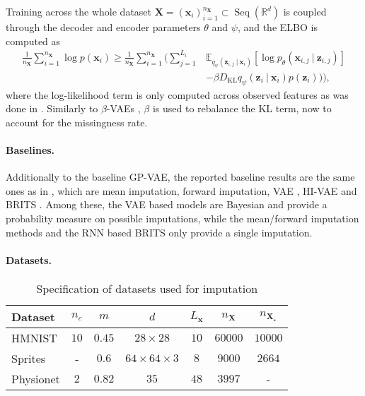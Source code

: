 \documentclass{article} \usepackage{iclr2021_conference,times}
\newcommand{\R}{\mathbb{R}}
\newcommand{\KL}{D_{\mathrm{KL}}}
\newcommand{\bx}{\mathbf{x}}
\newcommand{\bX}{\mathbf{X}}
\newcommand{\bz}{\mathbf{z}}
\newcommand{\EE}{\mathbb{E}}
\renewcommand\given[1][]{\:#1\vert\:}
\newcommand{\Seq}[1]{\operatorname{Seq}(#1)}
\theoremstyle{plain}
\theoremstyle{definition}
\begin{document}
Training across the whole dataset $\bX = (\bx_i)_{i=1}^{n_\bX} \subset \Seq{\R^d}$ is coupled through the decoder and encoder parameters $\theta$ and $\psi$, and the ELBO is computed as
\begin{align}
    \frac{1}{n_\bX} \sum_{i=1}^{n_\bX} \log p(\bx_i) \geq \frac{1}{n_\bX}\sum_{i=1}^{n_\bX} \Big( \sum_{j=1}^{L_i} &\EE_{q_\psi(\bz_{i, j} \given \bx_i)}[\log p_\theta(\bx_{i, j} \given \bz_{i, j})] \\
    &- \beta \KL{q_\psi(\bz_i \given \bx_i)}{p(\bz_{i})}) \Big), 
\end{align}
where the log-likelihood term is only computed across observed features as was done in \citet{nazabal2018handling}. Similarly to $\beta$-VAEs \citep{higgins2017beta}, $\beta$ is used to rebalance the KL term, now to account for the missingness rate. 

\paragraph{Baselines.} Additionally to the baseline GP-VAE, the reported baseline results are the same ones as in \citet{fortuin2019gpvae}, which are mean imputation, forward imputation, VAE \citep{kingma2013auto}, HI-VAE \citep{nazabal2018handling} and BRITS \citep{Cao2018brits}. Among these, the VAE based models are Bayesian and provide a probability measure on possible imputations, while the mean/forward imputation methods and the RNN based BRITS only provide a single imputation.

\paragraph{Datasets.}

\begin{wraptable}{r}{9.25cm}
    \vspace{-15pt}
	\caption{Specification of datasets used for imputation}
	\label{table:dataset_spec2}
	\vspace{-10pt}
\begin{center}
    \begin{small}
	\begin{sc}
    \begin{tabular}{lcccccc}
    \toprule
    Dataset  & $n_c$ & $m$ & $d$ & $L_\bx$ & $n_\bX$ & $n_{\bX_\star}$ \\
    \midrule
        HMNIST & $10$ & $0.45$ & $28 \times 28$ & $10$ & $60000$ & $10000$ \\
        Sprites & - & $0.6$ & $64 \times 64 \times 3$ & $8$ & $9000$ & $2664$ \\
        Physionet & $2$ & $0.82$ & $35$ & $48$ & $3997$ & - \\
    \bottomrule
    \end{tabular}
	\end{sc}
    \end{small}
    \end{center}
\vspace{-15pt}
\end{wraptable}
\end{document}

